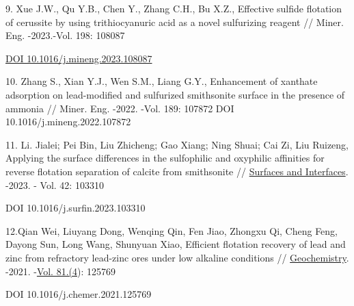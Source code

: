 \begin{references}
9. Xue J.W., Qu Y.B., Chen Y., Zhang C.H., Bu X.Z., Effective sulfide
flotation of cerussite by using trithiocyanuric acid as a novel
sulfurizing reagent // Miner. Eng. -2023.-Vol. 198: 108087

\href{https://doi.org/10.1016/j.mineng.2023.108087}{DOI
10.1016/j.mineng.2023.108087}

10. Zhang S., Xian Y.J., Wen S.M., Liang G.Y., Enhancement of xanthate
adsorption on lead-modified and sulfurized smithsonite surface in the
presence of ammonia // Miner. Eng. -2022. -Vol. 189: 107872 DOI
10.1016/j.mineng.2022.107872

11. Li. Jialei; Pei Bin, Liu Zhicheng; Gao Xiang; Ning Shuai; Cai Zi,
Liu Ruizeng, Applying the surface differences in the sulfophilic and
oxyphilic affinities for reverse flotation separation of calcite from
smithsonite // \href{javascript:void(0)}{Surfaces and Interfaces}.
-2023. - Vol. 42: 103310

DOI 10.1016/j.surfin.2023.103310

12.Qian Wei, Liuyang Dong, Wenqing Qin, Fen Jiao, Zhongxu Qi, Cheng
Feng, Dayong Sun, Long Wang, Shunyuan Xiao, Efficient flotation recovery
of lead and zinc from refractory lead-zinc ores under low alkaline
conditions //
\href{https://www.sciencedirect.com/journal/geochemistry}{Geochemistry}.
-2021.
-\href{https://www.sciencedirect.com/journal/geochemistry/vol/81/issue/4}{Vol.
81.(4}): 125769

DOI 10.1016/j.chemer.2021.125769
\end{references}

